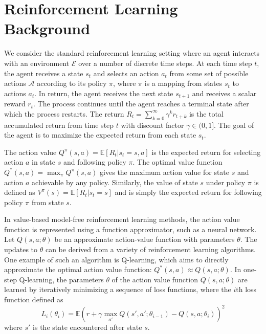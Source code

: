 %
\vspace{-0.1cm}
\section{Reinforcement Learning Background}
\label{sec:background}

We consider the standard reinforcement learning setting where an agent interacts with an environment $\mathcal{E}$ over a number of discrete time steps.
%
At each time step $t$, the agent receives a state $s_t$ and selects an action $a_t$ from some set of possible actions $\mathcal{A}$ according to its policy $\pi$, where $\pi$ is a mapping from states $s_t$ to actions $a_t$.
In return, the agent receives the next state $s_{t+1}$ and receives a scalar reward $r_t$.
The process continues until the agent reaches a terminal state after which the process restarts.
%
The return $R_t = \sum_{k=0}^{\infty} \gamma^k r_{t+k}$ is the total accumulated return from time step $t$ with discount factor $\gamma \in (0,1]$.
The goal of the agent is to maximize the expected return from each state $s_t$.

The action value $Q^{\pi}(s,a) = \mathbb{E}\left[R_t|s_t=s, a\right]$ is the expected return for selecting action $a$ in state $s$ and following policy $\pi$.
The optimal value function $Q^*(s,a) = \max_{\pi} Q^{\pi}(s,a)$ gives the maximum action value for state $s$ and action $a$ achievable by any policy.
Similarly, the value of state $s$ under policy $\pi$ is defined as $V^{\pi}(s) = \mathbb{E}\left[R_t|s_t=s\right]$ and is simply the expected return for following policy $\pi$ from state $s$.

In value-based model-free reinforcement learning methods, the action value function is represented using a function approximator, such as a neural network.
Let $Q(s,a;\theta)$ be an approximate action-value function with parameters $\theta$.
The updates to $\theta$ can be derived from a variety of reinforcement learning algorithms.
One example of such an algorithm is Q-learning, which aims to directly approximate the optimal action value function: $Q^*(s,a)\approx Q(s,a;\theta)$.
In one-step Q-learning, the parameters $\theta$ of the action value function $Q(s,a;\theta)$ are learned by iteratively minimizing a sequence of loss functions, where the $i$th loss function defined as
\begin{equation*}
    L_i(\theta_i) = \mathbb{E}\left(r + \gamma \max_{a'}Q(s', a';\theta_{i-1}) - Q(s,a;\theta_i) \right)^2
\end{equation*}
where $s'$ is the state encountered after state $s$.

